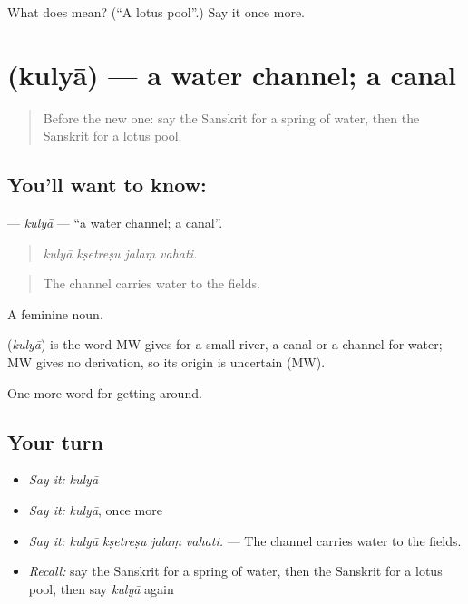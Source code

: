 \begin{tcolorbox}[breakable,colback=teal!4,colframe=teal!35!black,title={Before you move on}]
What does  mean? (\textquotedblleft{}A lotus pool\textquotedblright{}.) Say it once more.
\end{tcolorbox}
\section[\texorpdfstring{\sk{कुल्या} (kulyā)}{कुल्या (kulyā)}]{ (kulyā) — a water channel; a canal}

\label{lesson:SA-C419-kulya}



\begin{quote}
Before the new one: say the Sanskrit for a spring of water, then the Sanskrit for a lotus pool.
\end{quote}

\subsection*{You'll want to know: }
\textbf{} — \emph{kulyā} — \textquotedblleft{}a water channel; a canal\textquotedblright{}.

\begin{quote}
   
\end{quote}

\begin{quote}
\emph{kulyā kṣetreṣu jalaṃ vahati.}
\end{quote}

\begin{quote}
The channel carries water to the fields.
\end{quote}

A feminine noun.

\begin{cousinweb}
\textbf{} (\emph{kulyā}) is the word MW gives for a small river, a canal or a channel for water; MW gives no derivation, so its origin is uncertain (MW).
\end{cousinweb}

\begin{grammarlens}[title={What you've built}]
One more word for getting around.
\end{grammarlens}

\subsection*{Your turn}
\begin{itemize}
\raggedright
  \item \emph{Say it:} \emph{kulyā}
  \item \emph{Say it:} \emph{kulyā}, once more
  \item \emph{Say it:} \emph{kulyā kṣetreṣu jalaṃ vahati.} — The channel carries water to the fields.
  \item \emph{Recall:} say the Sanskrit for a spring of water, then the Sanskrit for a lotus pool, then say \emph{kulyā} again
\end{itemize}

